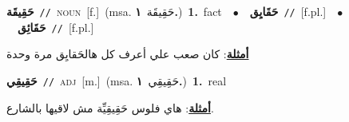 \documentclass[10pt,a4paper,twoside]{article} %
\begin{document}
\begin{multicols}{2}
{\setlength\topsep{0pt}\textbf{\foreignlanguage{arabic}{حَقِيقَة}}\ {\color{gray}\texttt{//}\color{black}}\ \textsc{noun}\ [f.]\ \color{gray}(msa. \foreignlanguage{arabic}{حَقِيقَة}~\foreignlanguage{arabic}{\textbf{١.}})\color{black}\ \textbf{1.}~fact\ \ $\bullet$\ \ \setlength\topsep{0pt}\textbf{\foreignlanguage{arabic}{حَقَايِق}}\ {\color{gray}\texttt{//}\color{black}}\ [f.pl.]\ \ $\bullet$\ \ \setlength\topsep{0pt}\textbf{\foreignlanguage{arabic}{حَقَائِق}}\ {\color{gray}\texttt{//}\color{black}}\ [f.pl.]\  \begin{flushright}\color{gray}\foreignlanguage{arabic}{\textbf{\underline{\foreignlanguage{arabic}{أمثلة}}}: كان صعب علي أعرف كل هالحَقايِق مرة وحدة}\end{flushright}\color{black}} \vspace{2mm}

{\setlength\topsep{0pt}\textbf{\foreignlanguage{arabic}{حَقِيقِي}}\ {\color{gray}\texttt{//}\color{black}}\ \textsc{adj}\ [m.]\ \color{gray}(msa. \foreignlanguage{arabic}{حَقِيقِي}~\foreignlanguage{arabic}{\textbf{١.}})\color{black}\ \textbf{1.}~real\  \begin{flushright}\color{gray}\foreignlanguage{arabic}{\textbf{\underline{\foreignlanguage{arabic}{أمثلة}}}: هاي فلوس حَقِيقِيِّة مش لاقيها بالشارع.}\end{flushright}\color{black}} \vspace{2mm}


\end{multicols}
\end{document}
